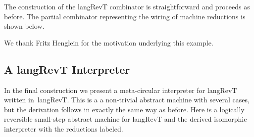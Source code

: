 \documentclass{llncs}
\begin{document}
The construction of the {{langRevT}} combinator is
straightforward and proceeds as before. The partial combinator
representing the wiring of machine reductions is shown below.

\begin{center}
\end{center}

\noindent
We thank Fritz Henglein for the motivation underlying this example.

\subsection{A {{langRevT}} Interpreter}
\label{sec:langrevt-int}

In the final construction we present a meta-circular interpreter for
{{langRevT}} written in~{{langRevT}}. This is a a non-trivial abstract
machine with several cases, but the derivation follows in exactly the same
way as before. Here is a logically reversible small-step abstract machine for
{{langRevT}} and the derived isomorphic interpreter with the reductions
labeled.
\end{document}
